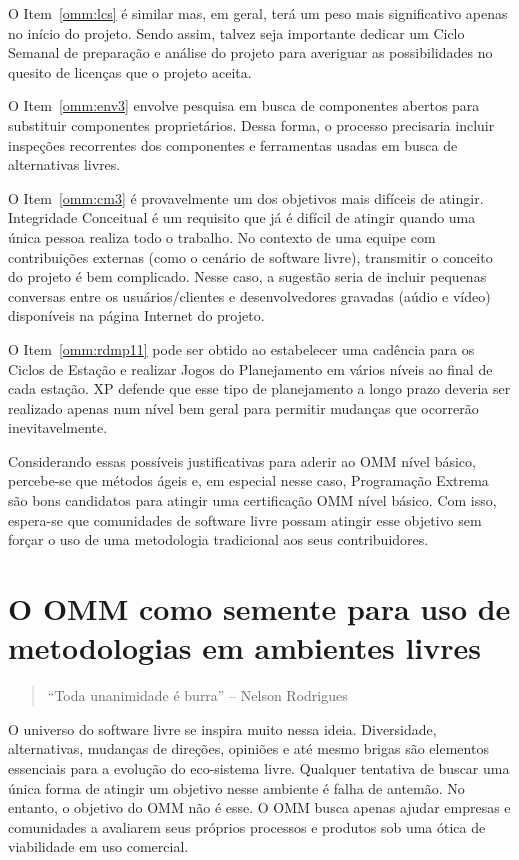O Item~\ref{omm:lcs} é similar mas, em geral, terá um peso mais
significativo apenas no início do projeto. Sendo assim, talvez seja
importante dedicar um Ciclo Semanal de preparação e análise do projeto
para averiguar as possibilidades no quesito de licenças que o projeto
aceita.

O Item~\ref{omm:env3} envolve pesquisa em busca de componentes abertos
para substituir componentes proprietários. Dessa forma, o processo
precisaria incluir inspeções recorrentes dos componentes e ferramentas
usadas em busca de alternativas livres.

O Item~\ref{omm:cm3} é provavelmente um dos objetivos mais difíceis de
atingir. Integridade Conceitual é um requisito que já é difícil de
atingir quando uma única pessoa realiza todo o trabalho. No contexto
de uma equipe com contribuições externas (como o cenário de software
livre), transmitir o conceito do projeto é bem complicado. Nesse caso,
a sugestão seria de incluir pequenas conversas entre os
usuários/clientes e desenvolvedores gravadas (aúdio e vídeo)
disponíveis na página Internet do projeto.

O Item~\ref{omm:rdmp11} pode ser obtido ao estabelecer uma cadência
para os Ciclos de Estação e realizar Jogos do Planejamento em vários
níveis ao final de cada estação. XP defende que esse tipo de
planejamento a longo prazo deveria ser realizado apenas num nível bem
geral para permitir mudanças que ocorrerão inevitavelmente.

Considerando essas possíveis justificativas para aderir ao OMM nível
básico, percebe-se que métodos ágeis e, em especial nesse caso,
Programação Extrema são bons candidatos para atingir uma certificação
OMM nível básico. Com isso, espera-se que comunidades de software
livre possam atingir esse objetivo sem forçar o uso de uma metodologia
tradicional aos seus contribuidores.

\section[OMM no contexto livre]{O OMM como semente para uso de
  metodologias em ambientes livres}
\label{sec:sl+omm}

\begin{quote}
  ``Toda unanimidade é burra'' -- Nelson Rodrigues
\end{quote}

O universo do software livre se inspira muito nessa
ideia. Diversidade, alternativas, mudanças de direções, opiniões e até
mesmo brigas são elementos essenciais para a evolução do eco-sistema
livre. Qualquer tentativa de buscar uma única forma de atingir um
objetivo nesse ambiente é falha de antemão. No entanto, o objetivo do
OMM não é esse. O OMM busca apenas ajudar empresas e comunidades a
avaliarem seus próprios processos e produtos sob uma ótica de
viabilidade em uso comercial.

